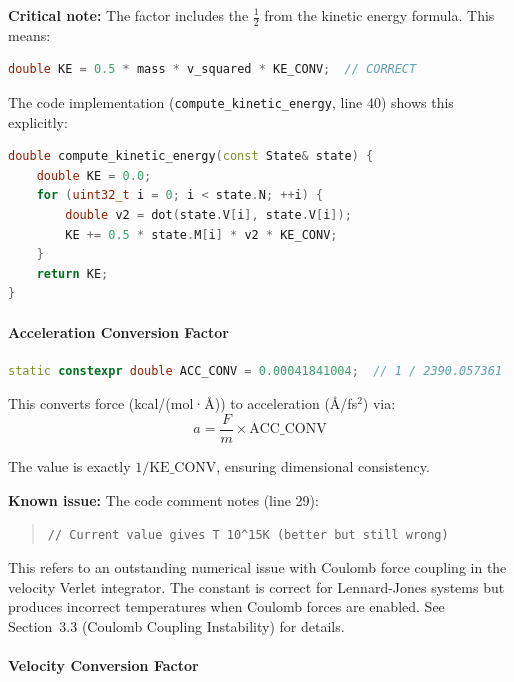 \documentclass[11pt]{article}
\begin{document}
\textbf{Critical note:} The factor includes the $\frac{1}{2}$ from the kinetic energy formula. This means:

\begin{lstlisting}[language=C++]
double KE = 0.5 * mass * v_squared * KE_CONV;  // CORRECT
\end{lstlisting}

The code implementation (\texttt{compute\_kinetic\_energy}, line 40) shows this explicitly:

\begin{lstlisting}[language=C++]
double compute_kinetic_energy(const State& state) {
    double KE = 0.0;
    for (uint32_t i = 0; i < state.N; ++i) {
        double v2 = dot(state.V[i], state.V[i]);
        KE += 0.5 * state.M[i] * v2 * KE_CONV;
    }
    return KE;
}
\end{lstlisting}

\paragraph{Acceleration Conversion Factor}

\begin{lstlisting}[language=C++]
static constexpr double ACC_CONV = 0.00041841004;  // 1 / 2390.057361
\end{lstlisting}

This converts force (kcal/(mol·\AA)) to acceleration (\AA/fs$^2$) via:
\begin{equation}
a = \frac{F}{m} \times \text{ACC\_CONV}
\end{equation}

The value is exactly $1 / \text{KE\_CONV}$, ensuring dimensional consistency.

\textbf{Known issue:} The code comment notes (line 29):
\begin{quote}
\texttt{// Current value gives T~10\^{}15K (better but still wrong)}
\end{quote}

This refers to an outstanding numerical issue with Coulomb force coupling in the velocity Verlet integrator. The constant is correct for Lennard-Jones systems but produces incorrect temperatures when Coulomb forces are enabled. See Section~3.3 (Coulomb Coupling Instability) for details.

\paragraph{Velocity Conversion Factor}
\end{document}
